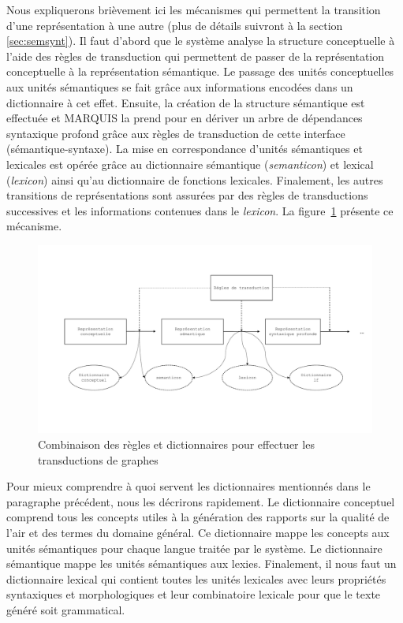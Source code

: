 Nous expliquerons brièvement ici les mécanismes qui permettent la transition d'une représentation à une autre (plus de détails suivront à la section \ref{sec:semsynt}). Il faut d'abord que le système analyse la structure conceptuelle à l'aide des règles de transduction qui permettent de passer de la représentation conceptuelle à la représentation sémantique. Le passage des unités conceptuelles aux unités sémantiques se fait grâce aux informations encodées dans un dictionnaire à cet effet. Ensuite, la création de la structure sémantique est effectuée et MARQUIS la prend pour en dériver un arbre de dépendances syntaxique profond grâce aux règles de transduction de cette interface (sémantique-syntaxe). La mise en correspondance d'unités sémantiques et lexicales est opérée grâce au dictionnaire sémantique (\emph{semanticon}) et lexical (\emph{lexicon}) ainsi qu'au dictionnaire de fonctions lexicales. Finalement, les autres transitions de représentations sont assurées par des règles de transductions successives et les informations contenues dans le \emph{lexicon}. La figure~\ref{fig:reglesdict} présente ce mécanisme.

\begin{figure}[htb]
	\centering
	\includegraphics[width=1\textwidth, trim = {0cm 2cm 0cm 0cm},clip]{ch2/figs/module.pdf}
	\caption{Combinaison des règles et dictionnaires pour effectuer les transductions de graphes \citep{LambreyImplementationcollocationspour2017}}
	\label{fig:reglesdict}
\end{figure}

Pour mieux comprendre à quoi servent les dictionnaires mentionnés dans le paragraphe précédent, nous les décrirons rapidement. Le dictionnaire conceptuel comprend tous les concepts utiles à la génération des rapports sur la qualité de l'air et des termes du domaine général. Ce dictionnaire mappe les concepts aux unités sémantiques pour chaque langue traitée par le système. Le dictionnaire sémantique mappe les unités sémantiques aux lexies. Finalement, il nous faut un dictionnaire lexical qui contient toutes les unités lexicales avec leurs propriétés syntaxiques et morphologiques et leur combinatoire lexicale pour que le texte généré soit grammatical.

